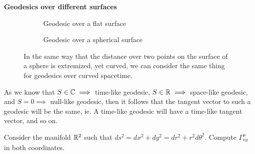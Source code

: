 \documentclass{article}
\begin{document}
 			\begin{exmp}
 				\textbf{Geodesics over different surfaces}
 				\begin{figure}[h]
 					\begin{subfigure}{0.46\textwidth}
 						\center
 						\vspace{0.5cm}
 						\caption{Geodesic over a flat surface}
 					\end{subfigure}
 					\begin{subfigure}{0.46\textwidth}
 						\center
 						\caption{Geodesic over a spherical surface}
 					\end{subfigure}
 					\caption{In the same way that the distance over two points on the surface of a sphere is extremized, yet curved, we can consider the same thing for geodesics over curved spacetime.}
 					
 				\end{figure}
 			
 				As we know that $S \in \mathbb{C} \implies$ time-like geodesic, $S\in \mathbb{R} \implies$ space-like geodesic, and $S = 0 \implies$ null-like geodesic, then it follows that the tangent vector to such a geodesic will be the same, ie. A time-like geodesic will have a time-like tangent vector, and so on.
 			\end{exmp}
 			\begin{exe}
 				Consider the manifold $\mathbb{R}^2$ such that $ds^2 = dx^2 + dy^2 = dr^2 + r^2 d\theta^2$. Compute $\Gamma_{\nu\rho}^\mu$ in both coordinates.
 			\end{exe}
\end{document}
